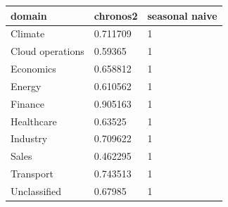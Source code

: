 \begin{tabular}{lll}
\toprule
domain & chronos2 & seasonal naive \\
\midrule
Climate & 0.711709 & 1 \\
Cloud operations & 0.59365 & 1 \\
Economics & 0.658812 & 1 \\
Energy & 0.610562 & 1 \\
Finance & 0.905163 & 1 \\
Healthcare & 0.63525 & 1 \\
Industry & 0.709622 & 1 \\
Sales & 0.462295 & 1 \\
Transport & 0.743513 & 1 \\
Unclassified & 0.67985 & 1 \\
\bottomrule
\end{tabular}
